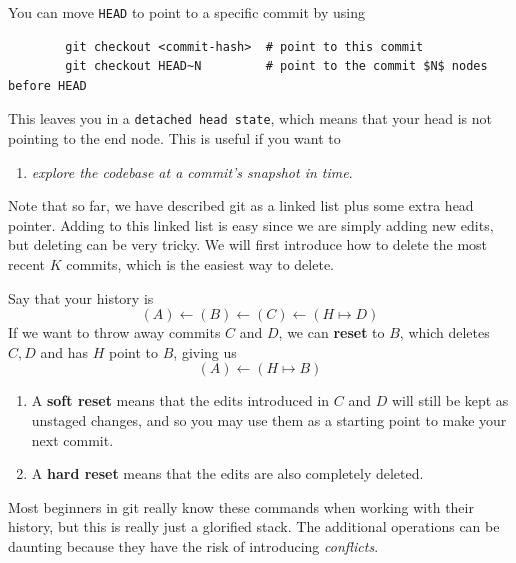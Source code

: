 \documentclass{article}
\begin{document}
    \begin{definition}
      You can move \texttt{HEAD} to point to a specific commit by using 
      \begin{lstlisting}
        git checkout <commit-hash>  # point to this commit  
        git checkout HEAD~N         # point to the commit $N$ nodes before HEAD
      \end{lstlisting} 
      This leaves you in a \texttt{detached head state}, which means that your head is not pointing to the end node. This is useful if you want to 
      \begin{enumerate}
        \item \textit{explore the codebase at a commit's snapshot in time}. 
      \end{enumerate}
    \end{definition} 

    Note that so far, we have described git as a linked list plus some extra head pointer. Adding to this linked list is easy since we are simply adding new edits, but deleting can be very tricky. We will first introduce how to delete the most recent $K$ commits, which is the easiest way to delete. 

    \begin{definition}[Reset] 
      Say that your history is 
      \begin{equation}
        (A) \leftarrow (B) \leftarrow (C) \leftarrow (H \mapsto D)
      \end{equation}  
      If we want to throw away commits $C$ and $D$, we can \textbf{reset} to $B$, which deletes $C, D$ and has $H$ point to $B$, giving us 
      \begin{equation}
        (A) \leftarrow (H \mapsto B)
      \end{equation} 
      \begin{enumerate}
        \item A \textbf{soft reset} means that the edits introduced in $C$ and $D$ will still be kept as unstaged changes, and so you may use them as a starting point to make your next commit. 
        \item A \textbf{hard reset} means that the edits are also completely deleted. 
      \end{enumerate}
    \end{definition} 

    Most beginners in git really know these commands when working with their history, but this is really just a glorified stack. The additional operations can be daunting because they have the risk of introducing \textit{conflicts}. 
\end{document}
